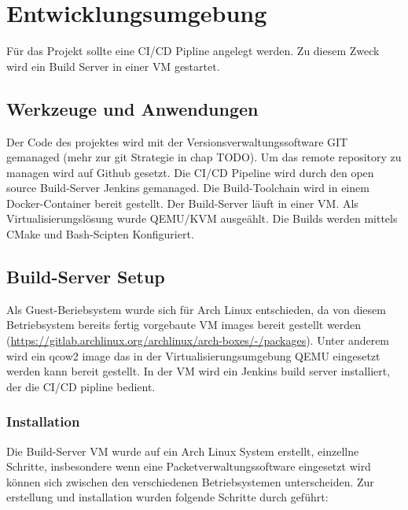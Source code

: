 \chapter{Entwicklungsumgebung}

Für das Projekt sollte eine \acf{CI/CD} Pipline angelegt werden. Zu diesem Zweck wird ein Build Server in einer \acf{VM} gestartet.

\section{Werkzeuge und Anwendungen}

Der Code des projektes wird mit der Versionsverwaltungssoftware GIT gemanaged (mehr zur git Strategie in chap TODO). Um das remote repository zu managen wird auf Github gesetzt. Die \ac{CI/CD} Pipeline wird durch den open source Build-Server Jenkins gemanaged. Die Build-Toolchain wird in einem Docker-Container bereit gestellt. Der Build-Server läuft in einer \ac{VM}. Als Virtualisierungslösung wurde QEMU/KVM ausgeählt. Die Builds werden mittels CMake und Bash-Scipten Konfiguriert.

\section{Build-Server Setup}

Als Guest-Beriebsystem wurde sich für Arch Linux entschieden, da von diesem Betriebsystem bereits fertig vorgebaute \ac{VM} images bereit gestellt werden (\url{https://gitlab.archlinux.org/archlinux/arch-boxes/-/packages}). Unter anderem wird ein qcow2 image das in der Virtualisierungsumgebung QEMU eingesetzt werden kann bereit gestellt.
In der \ac{VM} wird ein Jenkins build server installiert, der die CI/CD pipline bedient.

\subsection{Installation}

Die Build-Server \ac{VM} wurde auf ein Arch Linux System erstellt, einzellne Schritte, insbesondere wenn eine Packetverwaltungssoftware eingesetzt wird können sich zwischen den verschiedenen Betriebsystemen unterscheiden.
Zur erstellung und installation wurden folgende Schritte durch geführt:

